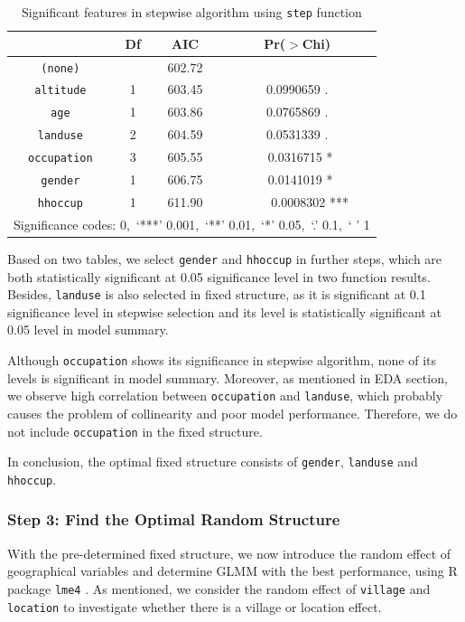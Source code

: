 \documentclass[11pt,twoside]{article}
\numberwithin{Theorem}{section}
\numberwithin{Definition}{section}
\numberwithin{Lemma}{section}
\numberwithin{Algorithm}{section}
\numberwithin{equation}{section}
\begin{document}
\begin{table}[!h]
	\centering
	\begin{tabular}{|c|c|c|c|}
		\hline
		 & Df & AIC & Pr($>$Chi) \\
		\hline
		\texttt{(none)} & & 602.72 & \\                      
		\texttt{altitude} & 1 & 603.45 & 0.0990659 . \\ 
		\texttt{age} & 1 & 603.86 & 0.0765869 . \\ 
		\texttt{landuse} & 2 & 604.59 & 0.0531339 . \\ 
		\texttt{occupation} & 3 & 605.55 & \ 0.0316715 * \\ 
		\texttt{gender} & 1 & 606.75 & \ 0.0141019 * \\ 
		\texttt{hhoccup} & 1 & 611.90 & \ \ \ \ 0.0008302 *** \\
		\hline
		\multicolumn{4}{|l|}{Significance codes: 0,\ ‘***’ 0.001,\ ‘**’ 0.01,\ ‘*’ 0.05,\ ‘.’ 0.1,\ ‘ ’ 1} \\
		\hline
	\end{tabular}
	\caption{Significant features in stepwise algorithm using \texttt{step} function}
	\label{tab:step1}
\end{table}

Based on two tables, we select \texttt{gender} and \texttt{hhoccup} in further steps, which are both statistically significant at 0.05 significance level in two function results. Besides, \texttt{landuse} is also selected in fixed structure,  as it is significant at 0.1 significance level in stepwise selection and its level is statistically significant at 0.05 level in model summary.  

Although \texttt{occupation} shows its significance in stepwise algorithm, none of its levels is significant in model summary. Moreover, as mentioned in EDA section, we observe high correlation between \texttt{occupation} and \texttt{landuse}, which probably causes the problem of collinearity and poor model performance. Therefore, we do not include \texttt{occupation} in the fixed structure.

In conclusion, the optimal fixed structure consists of \texttt{gender}, \texttt{landuse} and \texttt{hhoccup}.

\subsubsection{Step 3: Find the Optimal Random Structure}

With the pre-determined fixed structure, we now introduce the random effect of geographical variables and determine GLMM with the best performance, using R package \texttt{lme4} \cite{lme4}. As mentioned, we consider the random effect of \texttt{village} and \texttt{location} to investigate whether there is a village or location effect. 
\end{document}
